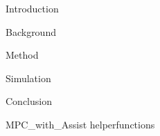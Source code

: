 \documentclass{article}
\begin{document}
{Introduction}

{Background}

{Method}

{Simulation}

{Conclusion}




\newpage
\doublespacing
\printbibliography[heading = bibintoc, title = References]    %

\singlespacing
\addappendix
{MPC_with_Assist}
{helperfunctions}


\end{document}

